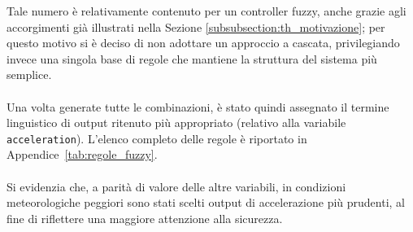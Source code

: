 \noindent Tale numero è relativamente contenuto per un controller fuzzy, anche grazie agli accorgimenti già illustrati nella
Sezione \ref{subsubsection:th_motivazione}; per questo motivo si è deciso di non adottare un 
approccio a cascata, privilegiando invece una singola base di regole che mantiene la struttura del sistema più semplice.  
\\\\
\noindent Una volta generate tutte le combinazioni, è stato quindi assegnato il termine linguistico di output ritenuto più appropriato 
(relativo alla variabile \texttt{acceleration}).    
L'elenco completo delle regole è riportato in Appendice~\ref{tab:regole_fuzzy}.  
\\\\
\noindent Si evidenzia che, a parità di valore delle altre variabili, in condizioni meteorologiche peggiori sono stati scelti 
output di accelerazione più prudenti, al fine di riflettere una maggiore attenzione alla sicurezza.